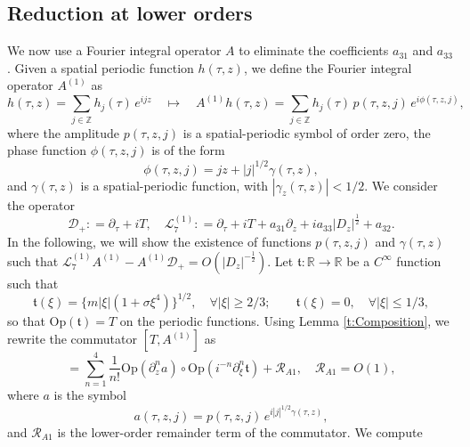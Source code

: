 \documentclass[12pt]{amsart}
\theoremstyle{remark}
\theoremstyle{definition}
\numberwithin{equation}{section}
\newcommand{\p}{\partial}
\newcommand{\R}{\mathbb{R}}
\newcommand{\Z}{\mathbb{Z}}
\newcommand{\f}{\frac}
\newcommand{\mD}{\mathcal{D}}
\newcommand{\mL}{\mathcal{L}}
\newcommand{\mR}{\mathcal{R}}
\begin{document}
\subsection{Reduction at lower orders}
We now use a Fourier integral operator $A$ to eliminate the coefficients $a_{31}$ and $a_{33}$.
Given a spatial periodic function $h(\tau, z)$, we define the Fourier integral operator $A^{(1)}$ as
\begin{equation} \label{ADef}
h(\tau,z) = \sum_{j \in \Z} h_j(\tau) \, e^{ijz} 
\quad \mapsto \quad
A^{(1)}h(\tau, z) = \sum_{j \in \Z} h_j(\tau) \, p(\tau,z,j) \, e^{i \phi(\tau,z,j)},
\end{equation}
where the amplitude $p(\tau,z,j)$ is a spatial-periodic symbol of order zero,
the phase function $\phi(\tau,z,j)$ is of the form
\begin{equation} \label{PhaseFunction phi}
\phi(\tau,z,j) = j z + |j|^{1/2} \gamma(\tau,z),
\end{equation}
and $\gamma(\tau,z)$ is a spatial-periodic function, with $|\gamma_z(\tau,z)| < 1/2$. 
We consider the operator 
\begin{equation} \label{DDefLseven}
 \mathcal{D}_+ : = \p_\tau + iT, \quad \mL_7^{(1)}: = \p_\tau +iT+a_{31}\p_z +ia_{33}|D_z|^\f12+ a_{32}.
\end{equation}
In the following, we will show the existence of functions $p(\tau, z,j)$ and $\gamma(\tau, z)$ such that $\mL_7^{(1)}A^{(1)} - A^{(1)} \mD_+ = O(|D_z|^{-\f12})$.
Let $\mathfrak{t} : \R \to \R$ be a $C^\infty$ function such that 
\begin{equation}  \label{SymbolTau}
\mathfrak{t}(\xi) = \{ m |\xi| (1+\sigma \xi^4)\}^{1/2}, 
\quad \forall |\xi| \geq 2/3; 
\qquad 
\mathfrak{t}(\xi) = 0, 
\quad \forall |\xi| \leq 1/3,
\end{equation}
so that Op$(\mathfrak{t}) = T$ on the periodic functions. 
Using Lemma \ref{t:Composition}, we rewrite the commutator $[T,A^{(1)}]$ as
\begin{equation*}
 [T,A^{(1)}] = \sum_{n=1}^4 \f{1}{n!}\text{Op}(\p_z^n a) \circ \text{Op}(i^{-n}\p_\xi^n \mathfrak{t}) + \mR_{A1},\quad  \mR_{A1}  = O(1),
\end{equation*}
where $a$ is the symbol
\begin{equation*}
   a(\tau, z,j) = p(\tau,z,j) \, e^{i |j|^{1/2}\gamma(\tau,z)},
\end{equation*}
and $\mR_{A1}$ is the lower-order remainder term of the commutator.
We compute
\end{document}
